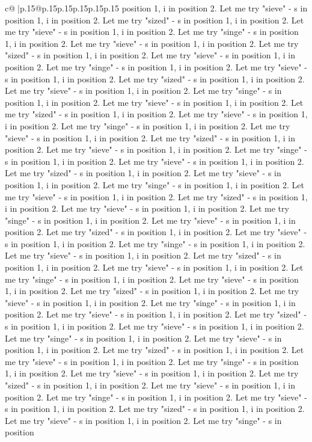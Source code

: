 \documentclass{article}
\begin{document}
{\begin{supertabular}{c@{$\;$}|p{.15\linewidth}@{}p{.15\linewidth}p{.15\linewidth}p{.15\linewidth}p{.15\linewidth}p{.15\linewidth}}
{{{position 1, i in position 2. Let me try "sieve" {-} s in position 1, i in position 2. Let me try "sized" {-} s in position 1, i in position 2. Let me try "sieve" {-} s in position 1, i in position 2. Let me try "singe" {-} s in position 1, i in position 2. Let me try "sieve" {-} s in position 1, i in position 2. Let me try "sized" {-} s in position 1, i in position 2. Let me try "sieve" {-} s in position 1, i in position 2. Let me try "singe" {-} s in position 1, i in position 2. Let me try "sieve" {-} s in position 1, i in position 2. Let me try "sized" {-} s in position 1, i in position 2. Let me try "sieve" {-} s in position 1, i in position 2. Let me try "singe" {-} s in position 1, i in position 2. Let me try "sieve" {-} s in position 1, i in position 2. Let me try "sized" {-} s in position 1, i in position 2. Let me try "sieve" {-} s in position 1, i in position 2. Let me try "singe" {-} s in position 1, i in position 2. Let me try "sieve" {-} s in position 1, i in position 2. Let me try "sized" {-} s in position 1, i in position 2. Let me try "sieve" {-} s in position 1, i in position 2. Let me try "singe" {-} s in position 1, i in position 2. Let me try "sieve" {-} s in position 1, i in position 2. Let me try "sized" {-} s in position 1, i in position 2. Let me try "sieve" {-} s in position 1, i in position 2. Let me try "singe" {-} s in position 1, i in position 2. Let me try "sieve" {-} s in position 1, i in position 2. Let me try "sized" {-} s in position 1, i in position 2. Let me try "sieve" {-} s in position 1, i in position 2. Let me try "singe" {-} s in position 1, i in position 2. Let me try "sieve" {-} s in position 1, i in position 2. Let me try "sized" {-} s in position 1, i in position 2. Let me try "sieve" {-} s in position 1, i in position 2. Let me try "singe" {-} s in position 1, i in position 2. Let me try "sieve" {-} s in position 1, i in position 2. Let me try "sized" {-} s in position 1, i in position 2. Let me try "sieve" {-} s in position 1, i in position 2. Let me try "singe" {-} s in position 1, i in position 2. Let me try "sieve" {-} s in position 1, i in position 2. Let me try "sized" {-} s in position 1, i in position 2. Let me try "sieve" {-} s in position 1, i in position 2. Let me try "singe" {-} s in position 1, i in position 2. Let me try "sieve" {-} s in position 1, i in position 2. Let me try "sized" {-} s in position 1, i in position 2. Let me try "sieve" {-} s in position 1, i in position 2. Let me try "singe" {-} s in position 1, i in position 2. Let me try "sieve" {-} s in position 1, i in position 2. Let me try "sized" {-} s in position 1, i in position 2. Let me try "sieve" {-} s in position 1, i in position 2. Let me try "singe" {-} s in position 1, i in position 2. Let me try "sieve" {-} s in position 1, i in position 2. Let me try "sized" {-} s in position 1, i in position 2. Let me try "sieve" {-} s in position 1, i in position 2. Let me try "singe" {-} s in position 1, i in position 2. Let me try "sieve" {-} s in position 1, i in position 2. Let me try "sized" {-} s in position 1, i in position 2. Let me try "sieve" {-} s in position 1, i in position 2. Let me try "singe" {-} s in position }}}
\end{supertabular}}
\end{document}
